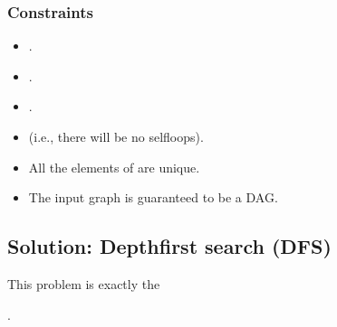 \documentclass[letterpaper,12pt,english]{book}
\begin{document}
\subsubsection{Constraints}
\label{\detokenize{Graph/797_All_Paths_From_Source_to_Target:constraints}}\begin{itemize}
\item {} 
\sphinxAtStartPar
{}.

\item {} 
\sphinxAtStartPar
{}.

\item {} 
\sphinxAtStartPar
{}.

\item {} 
\sphinxAtStartPar
{} (i.e., there will be no self\sphinxhyphen{}loops).

\item {} 
\sphinxAtStartPar
All the elements of  are unique.

\item {} 
\sphinxAtStartPar
The input graph is guaranteed to be a DAG.

\end{itemize}


\subsection{Solution: Depth\sphinxhyphen{}first search (DFS)}
\label{\detokenize{Graph/797_All_Paths_From_Source_to_Target:solution-depth-first-search-dfs}}
\sphinxAtStartPar
This problem is exactly the %
\begin{footnote}[75]\sphinxAtStartFootnote
{}
%
\end{footnote}.
\end{document}

